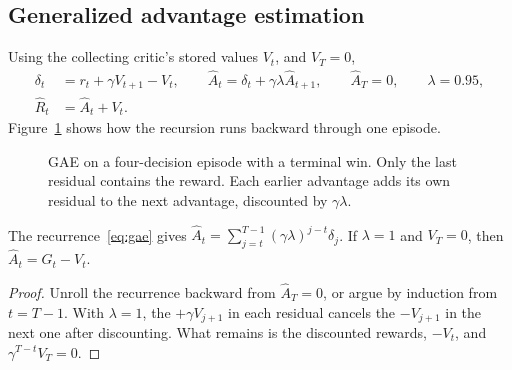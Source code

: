 \subsection{Generalized advantage estimation}
Using the collecting critic's stored values $V_t$, and $V_T=0$,
\begin{align}
  \delta_t&=r_t+\gamma V_{t+1}-V_t,\qquad
  \widehat A_t=\delta_t+\gamma\lambda\widehat A_{t+1},\qquad \widehat A_T=0,\qquad\lambda=0.95,\\
  \widehat R_t&=\widehat A_t+V_t.
\label{eq:gae}
\end{align}
Figure~\ref{fig:gae} shows how the recursion runs backward through one
episode.

\begin{figure}[htbp]
\centering
{}
\caption{GAE on a four-decision episode with a terminal win. Only the last
residual contains the reward. Each earlier advantage adds its own residual to
the next advantage, discounted by $\gamma\lambda$.}
\label{fig:gae}
\end{figure}

\begin{proposition}
\label{prop:gae}
The recurrence~\eqref{eq:gae} gives
$\widehat A_t=\sum_{j=t}^{T-1}(\gamma\lambda)^{j-t}\delta_j$. If $\lambda=1$
and $V_T=0$, then $\widehat A_t=G_t-V_t$.
\end{proposition}
\begin{proof}
Unroll the recurrence backward from $\widehat A_T=0$, or argue by induction
from $t=T-1$. With $\lambda=1$, the $+\gamma V_{j+1}$ in each residual cancels
the $-V_{j+1}$ in the next one after discounting. What remains is the
discounted rewards, $-V_t$, and $\gamma^{T-t}V_T=0$.
\end{proof}

